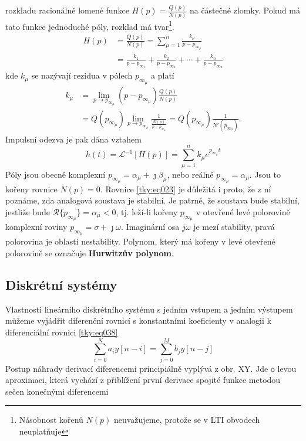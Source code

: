       rozkladu racionálně lomené funkce $H(p)=\frac{Q(p)}{N(p)}$ na částečné zlomky. Pokud má tato 
      funkce jednoduché póly, rozklad má tvar\footnote{Násobnost kořenů $N(p)$ neuvažujeme, protože 
      se v \textsc{LTI} obvodech neuplatňuje}.
      \begin{align}
         H(p)&=\frac{Q(p)}{N(p)} 
              =\sum_{\mu=1}^{n}\frac{k_\mu}{p-p_{\infty_\mu}}                  \nonumber \\
             &=\frac{k_1}{p-p_{\infty_1}}+\frac{k_2}{p-p_{\infty_2}}
               +\cdots+\frac{k_n}{p-p_{\infty_n}}                              \label{tky:eq004}
      \end{align}
      kde $k_\mu$ se nazývají rezidua v pólech $p_{\infty_\mu}$ a platí
      \begin{align}
        k_\mu &= \lim_{p\to p_{\infty_\mu}}(p-p_{\infty_\mu})\frac{Q(p)}{N(p)} \nonumber \\
        \,    &= Q(p_{\infty_\mu})\lim_{p\to
                 p_{\infty_\mu}}\frac{1}{\frac{N(p)}{p-p_{\infty_\mu}}}=
                 Q(p_{\infty_\mu})\frac{1}{N'(p_{\infty_\mu})}.                 \label{tky:eq006}
      \end{align}
      Impulsní odezva je pak dána vztahem
      \begin{equation}\label{tky:eq023}
        h(t)=\mathcal{L}^{-1}[H(p)]=\sum_{\mu=1}^nk_\mu e^{p_{\infty_\mu}t}
      \end{equation}
      Póly jsou obecně komplexní $p_{\infty_{\mu}}=\alpha_\mu+\jmath\beta_\mu$, nebo reálné
      $p_{\infty_{\mu}}=\alpha_\mu$. Jsou to kořeny rovnice $N(p)=0$. Rovnice \ref{tky:eq023} je
      důležitá i proto, že z ní poznáme, zda analogová soustava je stabilní. Je patrné, že soustava
      bude stabilní, jestliže bude $\mathcal{R}\{p_{\infty_{\mu}}\}=\alpha_\mu<0$, tj. leží-li
      kořeny $p_{\infty_{\mu}}$ v otevřené levé polorovině komplexní roviny
      $p_{\infty_{\mu}}=\sigma+\jmath\omega$. Imaginární osa $j\omega$ je mezí stability, pravá
      polorovina je oblastí nestability. Polynom, který má kořeny v levé otevřené polorovině se
      označuje \textbf{Hurwitzův polynom}.

      
    
    \subsection{Diskrétní systémy}\label{tky:IchIIsecIIIssecII}
      Vlastnosti lineárního diskrétního systému s jedním vstupem a jedním výstupem můžeme vyjádřit
      diferenční rovnicí s konstantními koeficienty v analogii k diferenciální rovnici
      \ref{tky:eq038}
      \begin{equation}\label{tky:eq048}
        \sum_{i=0}^N a_iy[n-i] = \sum_{j=0}^M b_jy[n-j]
      \end{equation}
      Postup náhrady derivací diferencemi principiálně vyplývá z obr. XY. Jde o levou aproximaci,
      která vychází z přiblížení první derivace spojité funkce metodou sečen konečnými diferencemi

